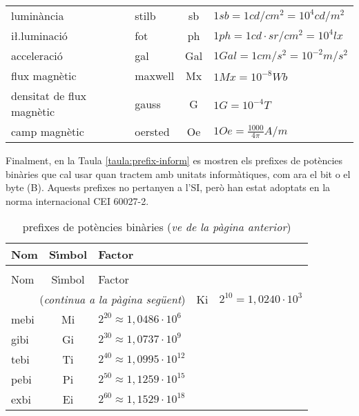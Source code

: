 \begin{longtable}[h]{llcl}
    lumin\`{a}ncia & stilb & \unit{sb} & $1\unit{sb} = 1\unit{cd/cm^2} = 10^4\unit{cd/m^2}$ \\
    i{\l.l}uminaci\'{o} & fot & \unit{ph} & $1\unit{ph} = 1\unit{cd\cdot sr/cm^2} = 10^4\unit{lx}$ \\
    acceleraci\'{o} & gal & \unit{Gal} & $1\unit{Gal} = 1\unit{cm/s^2} = 10^{-2}\unit{m/s^2}$ \\
    flux magn\`{e}tic & maxwell & \unit{Mx} & $1\unit{Mx} = 10^{-8}\unit{Wb}$ \\
    densitat de flux magn\`{e}tic & gauss & \unit{G} & $1\unit{G} = 10^{-4}\unit{T}$ \\
    camp magn\`{e}tic & oersted & \unit{Oe} & $1\unit{Oe} = \frac{1000}{4\pi}\unit{A/m}$ \\
\bottomrule[1pt]
\end{longtable}

\break
Finalment, en la Taula \vref{taula:prefix-inform} es mostren els prefixes de pot\`{e}ncies bin\`{a}ries que cal usar quan tractem amb unitats inform\`{a}tiques, com ara el bit o el byte (B). Aquests prefixes no pertanyen a l'SI, per\`{o} han estat adoptats en la norma internacional \textsf{CEI 60027-2}.

\begin{longtable}[h]{lcl}
   \caption{\label{taula:prefix-inform} prefixes de pot\`{e}ncies bin\`{a}ries}\\
   \toprule[1pt]
    Nom & S\'{\i}mbol  & Factor \\
   \midrule
   \endfirsthead
   \caption[]{prefixes de pot\`{e}ncies bin\`{a}ries (\emph{ve de la p\`{a}gina
   anterior})}\\
   \toprule[1pt]
    Nom & S\'{\i}mbol  & Factor \\
   \midrule
   \endhead
   \midrule
   \multicolumn{3}{r}{(\emph{continua a la p\`{a}gina seg\"{u}ent})}
   \endfoot
   \endlastfoot
   kibi & Ki   & $2^{10} = 1{,}0240\cdot10^3$  \\
   mebi & Mi   & $2^{20} \approx 1{,}0486\cdot10^6$ \\
   gibi & Gi   & $2^{30} \approx 1{,}0737\cdot10^9$  \\
   tebi & Ti   & $2^{40} \approx 1{,}0995\cdot10^{12}$ \\
   pebi & Pi   & $2^{50} \approx 1{,}1259\cdot10^{15}$ \\
   exbi & Ei   & $2^{60} \approx 1{,}1529\cdot10^{18}$ \\
   \bottomrule[1pt]
\end{longtable}
        
   

